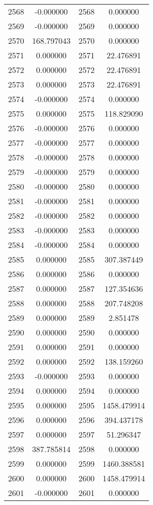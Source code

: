 \documentclass[12pt]{article}
\begin{document}
\begin{longtable}{@{}cccc@{}}
2568 & -0.000000 & 2568 & 0.000000 \\
2569 & -0.000000 & 2569 & 0.000000 \\
2570 & 168.797043 & 2570 & 0.000000 \\
2571 & 0.000000 & 2571 & 22.476891 \\
2572 & 0.000000 & 2572 & 22.476891 \\
2573 & 0.000000 & 2573 & 22.476891 \\
2574 & -0.000000 & 2574 & 0.000000 \\
2575 & 0.000000 & 2575 & 118.829090 \\
2576 & -0.000000 & 2576 & 0.000000 \\
2577 & -0.000000 & 2577 & 0.000000 \\
2578 & -0.000000 & 2578 & 0.000000 \\
2579 & -0.000000 & 2579 & 0.000000 \\
2580 & -0.000000 & 2580 & 0.000000 \\
2581 & -0.000000 & 2581 & 0.000000 \\
2582 & -0.000000 & 2582 & 0.000000 \\
2583 & -0.000000 & 2583 & 0.000000 \\
2584 & -0.000000 & 2584 & 0.000000 \\
2585 & 0.000000 & 2585 & 307.387449 \\
2586 & 0.000000 & 2586 & 0.000000 \\
2587 & 0.000000 & 2587 & 127.354636 \\
2588 & 0.000000 & 2588 & 207.748208 \\
2589 & 0.000000 & 2589 & 2.851478 \\
2590 & 0.000000 & 2590 & 0.000000 \\
2591 & 0.000000 & 2591 & 0.000000 \\
2592 & 0.000000 & 2592 & 138.159260 \\
2593 & -0.000000 & 2593 & 0.000000 \\
2594 & 0.000000 & 2594 & 0.000000 \\
2595 & 0.000000 & 2595 & 1458.479914 \\
2596 & 0.000000 & 2596 & 394.437178 \\
2597 & 0.000000 & 2597 & 51.296347 \\
2598 & 387.785814 & 2598 & 0.000000 \\
2599 & 0.000000 & 2599 & 1460.388581 \\
2600 & 0.000000 & 2600 & 1458.479914 \\
2601 & -0.000000 & 2601 & 0.000000 \\

\end{longtable}
\end{document}
